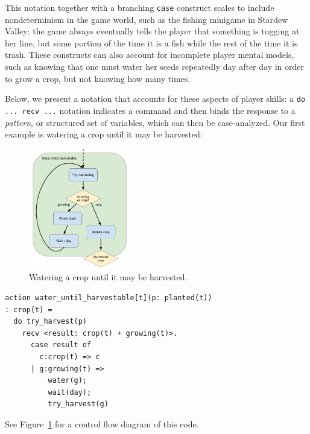 This notation together with a branching \verb|case| construct
scales to include nondeterminism in the game world, such as the fishing
minigame in Stardew Valley: the game always eventually tells the player
that something is tugging at her line, but some portion of the time it is a
fish while the rest of the time it is trash.  These constructs can also
account for incomplete player mental models, such as knowing that one must
water her seeds repeatedly day after day in order to grow a crop, but not
knowing how many times.

Below, we present a notation that accounts for these aspects of player
skills: a \verb|do ... recv ...| notation indicates a command and then
binds the response to a {\em pattern}, or structured set of variables,
which can then be case-analyzed.
Our first example is watering a crop until it may be harvested:
%
\begin{figure}[t]
  \includegraphics[width=0.4\textwidth]{sdv-water-harvest.png}
  \caption{Watering a crop until it may be harvested.}
  \label{fig:harvest}
\end{figure}
%
\begin{verbatim}
action water_until_harvestable[t](p: planted(t))
: crop(t) =
  do try_harvest(p)
    recv <result: crop(t) + growing(t)>.
      case result of
        c:crop(t) => c
      | g:growing(t) => 
          water(g); 
          wait(day); 
          try_harvest(g)
\end{verbatim}
See Figure~\ref{fig:harvest} for a control flow diagram of this code.

